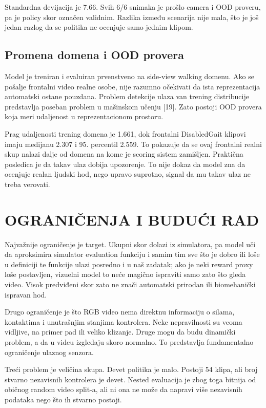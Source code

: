 ﻿\documentclass[12pt,a4paper]{report}
\begin{document}
Standardna devijacija je 7.66. Svih 6/6 snimaka je prošlo camera i OOD proveru,
pa je policy skor označen validnim. Razlika između scenarija nije mala, što je
još jedan razlog da se politika ne ocenjuje samo jednim klipom.

\section{Promena domena i OOD provera}

Model je treniran i evaluiran prvenstveno na side-view walking domenu. Ako se
pošalje frontalni video realne osobe, nije razumno očekivati da ista
reprezentacija automatski ostane pouzdana. Problem detekcije ulaza van trening
distribucije predstavlja poseban problem u mašinskom učenju [19]. Zato postoji OOD
provera koja meri udaljenost u reprezentacionom prostoru.

Prag udaljenosti trening domena je 1.661, dok frontalni DisabledGait klipovi
imaju medijanu 2.307 i 95. percentil 2.559. To pokazuje da se ovaj frontalni
realni skup nalazi dalje od domena na kome je scoring sistem zamišljen.
Praktična posledica je da takav ulaz dobija upozorenje. To nije dokaz da model
zna da ocenjuje realan ljudski hod, nego upravo suprotno, signal da mu takav
ulaz ne treba verovati.

\chapter{OGRANIČENJA I BUDUĆI RAD}

Najvažnije ograničenje je target. Ukupni skor dolazi iz simulatora, pa model
uči da aproksimira simulator evaluation funkciju i samim tim sve što je dobro ili
loše u definiciji te funkcije ulazi posredno i u naš zadatak; ako je neki reward
proxy loše postavljen, vizuelni model to neće magično ispraviti samo zato što
gleda video. Visok predviđeni skor zato ne znači automatski prirodan ili
biomehanički ispravan hod.

Drugo ograničenje je što RGB video nema direktnu informaciju o silama,
kontaktima i unutrašnjim stanjima kontrolera. Neke nepravilnosti su veoma
vidljive, na primer pad ili veliko klizanje. Druge mogu da budu dinamički
problem, a da u videu izgledaju skoro normalno. To predstavlja fundamentalno
ograničenje ulaznog senzora.

Treći problem je veličina skupa. Devet politika je malo. Postoji 54 klipa, ali
broj stvarno nezavisnih kontrolera je devet. Nested evaluacija je zbog toga
bitnija od običnog random video split-a, ali ni ona ne može da napravi više
nezavisnih podataka nego što ih stvarno postoji.
\end{document}
